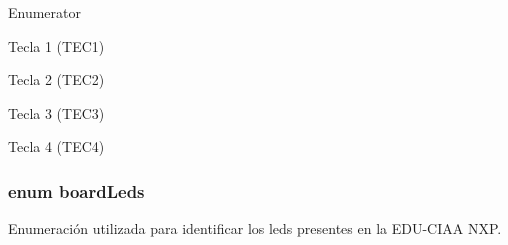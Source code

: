 \begin{Desc}
\item[Enumerator]\par
\begin{description}
\item[{\em 
key1\hypertarget{group__hardware_gga8d70125ca4047f0f7ea513cd8568953da483a28cafb544915d9cd44f2c69fc706}{}\label{group__hardware_gga8d70125ca4047f0f7ea513cd8568953da483a28cafb544915d9cd44f2c69fc706}
}]Tecla 1 (T\+E\+C1) \item[{\em 
key2\hypertarget{group__hardware_gga8d70125ca4047f0f7ea513cd8568953dab8d9f65fc5604a8b8a0cdcbaf03bbbe0}{}\label{group__hardware_gga8d70125ca4047f0f7ea513cd8568953dab8d9f65fc5604a8b8a0cdcbaf03bbbe0}
}]Tecla 2 (T\+E\+C2) \item[{\em 
key3\hypertarget{group__hardware_gga8d70125ca4047f0f7ea513cd8568953da376c29473ae1a854ff46b2b171985093}{}\label{group__hardware_gga8d70125ca4047f0f7ea513cd8568953da376c29473ae1a854ff46b2b171985093}
}]Tecla 3 (T\+E\+C3) \item[{\em 
key4\hypertarget{group__hardware_gga8d70125ca4047f0f7ea513cd8568953da84011848209e666e74469d6dfba542eb}{}\label{group__hardware_gga8d70125ca4047f0f7ea513cd8568953da84011848209e666e74469d6dfba542eb}
}]Tecla 4 (T\+E\+C4) \end{description}
\end{Desc}
\subsubsection[{\texorpdfstring{board\+Leds}{boardLeds}}]{\setlength{\rightskip}{0pt plus 5cm}enum {\bf board\+Leds}}\hypertarget{group__hardware_ga2a000bf02da2abba53355f3fcfdb2d0b}{}\label{group__hardware_ga2a000bf02da2abba53355f3fcfdb2d0b}


Enumeración utilizada para identificar los leds presentes en la E\+D\+U-\/\+C\+I\+AA N\+XP. 

